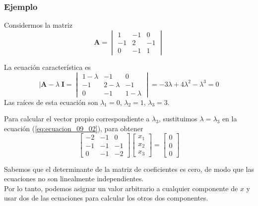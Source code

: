 \begin{frame}
\frametitle{Ejemplo}
Considermos la matriz
\begin{equation}
\mathbf{A} = \begin{vmatrix}
1 & -1 & 0 \\
-1 & 2 & -1 \\
0 & -1 & 1
\end{vmatrix}
\label{eq:ecuacion_09_a}
\end{equation}
\end{frame}
\begin{frame}
La ecuación característica es
\begin{equation}
\vert \mathbf{A} - \lambda \; \mathbf{I} =  \begin{vmatrix}
1 - \lambda & -1 & 0 \\
-1 & 2 - \lambda & -1 \\
0 & -1 & 1 - \lambda
\end{vmatrix} 
= -3 \lambda +  4 \lambda^{2} - \lambda^{3} = 0
\label{eq:ecuacion_09_b}
\end{equation}
\pause
Las raíces de esta ecuación son $\lambda_{1} = 0$, $\lambda_{2} = 1$, $\lambda_{3} = 3$.
\end{frame}
\begin{frame}
Para calcular el vector propio correspondiente a $\lambda_{3}$, sustituimos $\lambda = \lambda_{3}$ en la ecuación (\ref{eq:ecuacion_09_02}), para obtener
\begin{equation}
\begin{bmatrix}
-2 & -1 & 0 \\
-1 & -1 & -1 \\
0 & -1 & -2
\end{bmatrix}
\begin{bmatrix}
x_{1} \\
x_{2} \\
x_{3} 
\end{bmatrix} = 
\begin{bmatrix}
0 \\
0 \\
0
\end{bmatrix}
\label{eq:ecuacion_09_c}
\end{equation}
\end{frame}
\begin{frame}
Sabemos que el determinante de la matriz de coeficientes es cero, de modo que las ecuaciones no son linealmente independientes. 
\\
\bigskip
Por lo tanto, podemos asignar un valor arbitrario a cualquier componente de $x$ y usar dos de las ecuaciones para calcular los otros dos componentes.
\end{frame}
